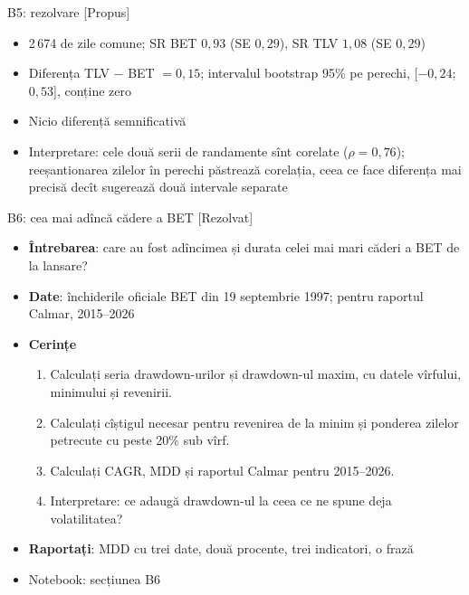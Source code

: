 \ifsolutions
\begin{frame}{B5: rezolvare [Propus]}
\itemsize{\footnotesize}
\begin{itemize}
    \item 2\,674 de zile comune; SR BET $0{,}93$ (SE $0{,}29$), SR TLV $1{,}08$ (SE $0{,}29$)
    \item Diferența TLV $-$ BET $= 0{,}15$; intervalul bootstrap 95\% pe perechi, [$-0{,}24$; $0{,}53$], conține zero
    \item Nicio diferență semnificativă
    \item Interpretare: cele două serii de randamente sînt corelate ($\rho = 0{,}76$); reeșantionarea zilelor în perechi păstrează corelația, ceea ce face diferența mai precisă decît sugerează două intervale separate
\end{itemize}
\end{frame}
\fi

\begin{frame}{B6: cea mai adîncă cădere a BET [Rezolvat]}
\itemsize{\footnotesize}
\begin{itemize}
\item \textbf{Întrebarea}: care au fost adîncimea și durata celei mai mari căderi a BET de la lansare?
\item \textbf{Date}: închiderile oficiale BET din 19 septembrie 1997; pentru raportul Calmar, 2015--2026
\item \textbf{Cerințe}
\begin{enumerate}
    \item Calculați seria drawdown-urilor și drawdown-ul maxim, cu datele vîrfului, minimului și revenirii.
    \item Calculați cîștigul necesar pentru revenirea de la minim și ponderea zilelor petrecute cu peste 20\% sub vîrf.
    \item Calculați CAGR, MDD și raportul Calmar pentru 2015--2026.
    \item Interpretare: ce adaugă drawdown-ul la ceea ce ne spune deja volatilitatea?
\end{enumerate}
\item \textbf{Raportați}: MDD cu trei date, două procente, trei indicatori, o frază
\item Notebook: secțiunea B6
\end{itemize}
\end{frame}

